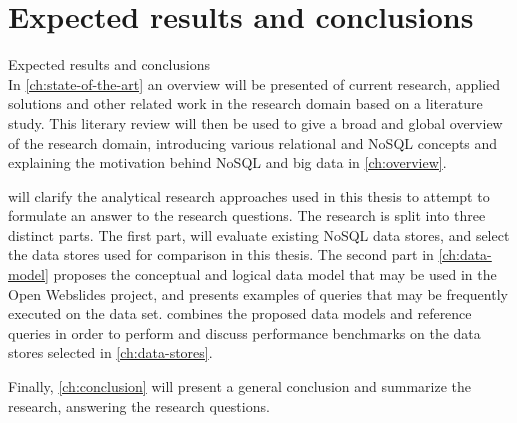 \section{Expected results and conclusions}
\label{sec:expected-results-and-conclusions}


Expected results and conclusions\\

In \cref{ch:state-of-the-art} an overview will be presented of current research, applied solutions and other related work in the research domain based on a literature study.
This literary review will then be used to give a broad and global overview of the research domain, introducing various relational and NoSQL concepts and explaining the motivation behind NoSQL and big data in \cref{ch:overview}.

 will clarify the analytical research approaches used in this thesis to attempt to formulate an answer to the research questions.
The research is split into three distinct parts.
The first part,  will evaluate existing NoSQL data stores, and select the data stores used for comparison in this thesis.
The second part in \cref{ch:data-model} proposes the conceptual and logical data model that may be used in the Open Webslides project, and presents examples of queries that may be frequently executed on the data set.
 combines the proposed data models and reference queries in order to perform and discuss performance benchmarks on the data stores selected in \cref{ch:data-stores}.

Finally, \cref{ch:conclusion} will present a general conclusion and summarize the research, answering the research questions.
